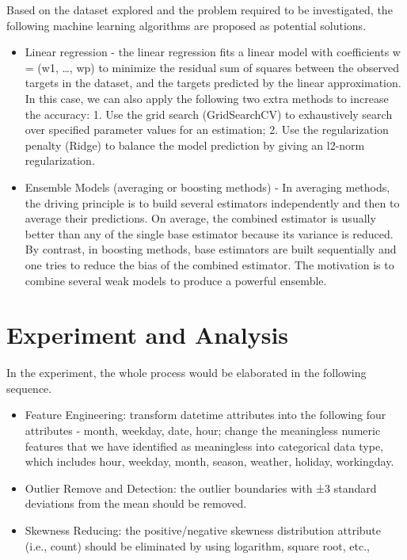Based on the dataset explored and the problem required to be investigated, the following machine learning algorithms are proposed as potential solutions.

\begin{itemize}
    \item Linear regression - the linear regression fits a linear model with coefficients w = (w1, …, wp) to minimize the residual sum of squares between the observed targets in the dataset, and the targets predicted by the linear approximation. In this case, we can also apply the following two extra methods to increase the accuracy: 1. Use the grid search (GridSearchCV) to exhaustively search over specified parameter values for an estimation; 2. Use the regularization penalty (Ridge) to balance the model prediction by giving an l2-norm regularization.
    \item Ensemble Models (averaging or boosting methods) - In averaging methods, the driving principle is to build several estimators independently and then to average their predictions. On average, the combined estimator is usually better than any of the single base estimator because its variance is reduced. By contrast, in boosting methods, base estimators are built sequentially and one tries to reduce the bias of the combined estimator. The motivation is to combine several weak models to produce a powerful ensemble.
\end{itemize}

\section{Experiment and Analysis} \label{sec-experiment}
In the experiment, the whole process would be elaborated in the following sequence.
\begin{itemize}
    \item Feature Engineering: transform datetime attributes into the following four attributes - month, weekday, date, hour; change the meaningless numeric features that we have identified as meaningless into categorical data type, which includes hour, weekday, month, season, weather, holiday, workingday.
    \item Outlier Remove and Detection: the outlier boundaries with ±3 standard deviations from the mean should be removed.
    \item Skewness Reducing: the positive/negative skewness distribution attribute (i.e., count) should be eliminated by using logarithm, square root, etc.,
\end{itemize}

